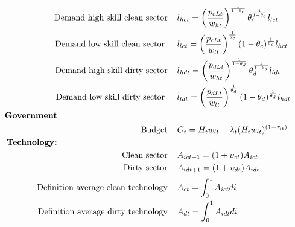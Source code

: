 \begin{align*}
%
\text{Demand high skill clean sector}\hspace{4mm}&l_{hct}= \left(\frac{p_{cLt}}{w_{ht}}\right)^{\frac{1}{1-\theta_c}}\theta_c^{\frac{1}{1-\theta_c}}l_{lct}\\
%
\text{Demand low skill clean sector } \hspace{4mm}&l_{lct}= \left(\frac{p_{cLt}}{w_{lt}}\right)^{\frac{1}{\theta_c}}(1-\theta_c)^{\frac{1}{\theta_c}}l_{hct}\\
%
\text{Demand high skill dirty sector} \hspace{4mm}&l_{hdt}= \left(\frac{p_{dLt}}{w_{ht}}\right)^{\frac{1}{1-\theta_d}}\theta_d^{\frac{1}{1-\theta_d}}l_{ldt}\\
%
\text{Demand low skill dirty sector } \hspace{4mm}&l_{ldt}= \left(\frac{p_{dLt}}{w_{lt}}\right)^{\frac{1}{\theta_d}}(1-\theta_d)^{\frac{1}{\theta_d}}l_{hdt}\\
\text{\textbf{Government}}\hspace{50mm}& \nonumber\\
\text{Budget}\hspace{4mm}& G_t=H_tw_{lt}-\lambda_t(H_t w_{lt})^{(1-\tau_{lt})}
\\
\text{\textbf{Technology:}}\hspace{50mm}&\\
\text{Clean sector}\hspace{4mm}& A_{ict+1}=(1+\upsilon_{ct})A_{ict}\\
\text{Dirty sector}\hspace{4mm}& A_{idt+1}=(1+\upsilon_{dt})A_{idt}\\
\text{Definition average clean technology}\hspace{4mm}& A_{ct}=\int_0^1A_{ict}di\\
\text{Definition average dirty technology}\hspace{4mm}& A_{dt}=\int_0^1A_{idt}di
\end{align*}

